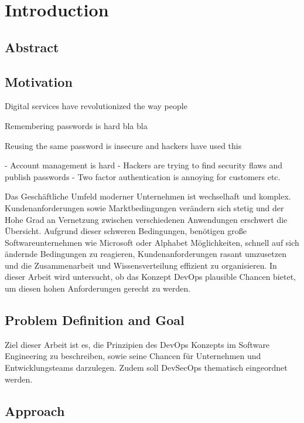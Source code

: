 \section{Introduction}
\subsection{Abstract}

\subsection{Motivation}

Digital services have revolutionized the way people 


Remembering passwords is hard bla bla

Reusing the same password is insecure and hackers have used this



- Account management is hard
- Hackers are trying to find security flaws and publish passwords
- Two factor authentication is annoying for customers etc.



Das Geschäftliche Umfeld moderner Unternehmen ist wechselhaft und komplex.
Kundenanforderungen sowie Marktbedingungen verändern sich stetig und der Hohe Grad an
Vernetzung zwischen verschiedenen Anwendungen erschwert die Übersicht.
Aufgrund dieser schweren Bedingungen, benötigen große Softwareunternehmen wie
Microsoft oder Alphabet Möglichkeiten, schnell auf sich ändernde Bedingungen zu reagieren,
Kundenanforderungen rasant umzusetzen und die Zusammenarbeit und Wissensverteilung effizient
zu organisieren. In dieser Arbeit wird untersucht, ob das Konzept DevOps plausible
Chancen bietet, um diesen hohen Anforderungen gerecht zu werden.

\subsection{Problem Definition and Goal}

Ziel dieser Arbeit ist es, die Prinzipien des DevOps Konzepts im Software Engineering
zu beschreiben, sowie seine Chancen für Unternehmen und Entwicklungsteams darzulegen.
Zudem soll DevSecOps thematisch eingeordnet werden. 

\subsection{Approach}

